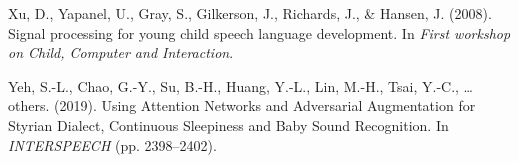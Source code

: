 \documentclass[english,,man]{apa6}
\begin{document}
\leavevmode\hypertarget{ref-xu2008signal}{}%
Xu, D., Yapanel, U., Gray, S., Gilkerson, J., Richards, J., \& Hansen, J. (2008). Signal processing for young child speech language development. In \emph{First workshop on Child, Computer and Interaction}.

\leavevmode\hypertarget{ref-yeh2019using}{}%
Yeh, S.-L., Chao, G.-Y., Su, B.-H., Huang, Y.-L., Lin, M.-H., Tsai, Y.-C., \ldots{} others. (2019). Using Attention Networks and Adversarial Augmentation for Styrian Dialect, Continuous Sleepiness and Baby Sound Recognition. In \emph{INTERSPEECH} (pp. 2398--2402).

\clearpage
\renewcommand{\listfigurename}{Figure captions}
\end{document}
